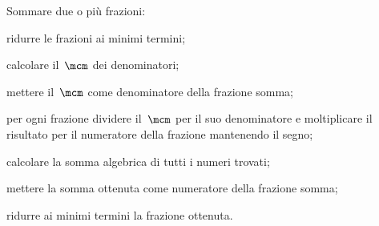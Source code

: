 \begin{procedura}
Sommare due o più frazioni:
\begin{enumeratea}
\item ridurre le frazioni ai minimi termini;
\item calcolare il~$\mcm$ dei denominatori;
\item mettere il~$\mcm$ come denominatore della frazione somma;
\item per ogni frazione dividere il~$\mcm$ per il suo denominatore e moltiplicare il risultato per il
numeratore della frazione mantenendo il segno;
\item calcolare la somma algebrica di tutti i numeri trovati;
\item mettere la somma ottenuta come numeratore della frazione somma;
\item ridurre ai minimi termini la frazione ottenuta.
\end{enumeratea}
\end{procedura}
